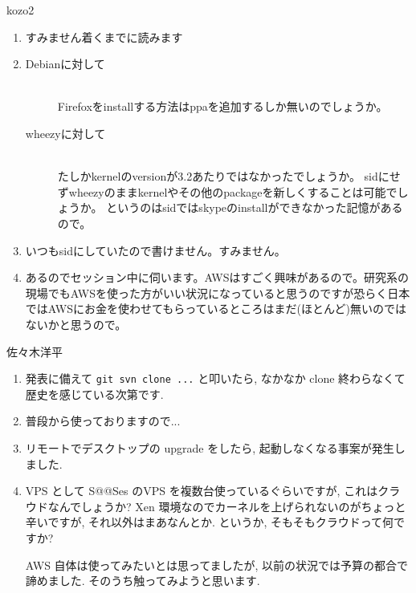 \documentclass[mingoth,a4paper]{jsarticle}
\begin{document}
\begin{prework}{ kozo2 }
  \begin{enumerate}
  \item %
    すみません着くまでに読みます
  \item %
    \begin{description}
    \item[Debianに対して]　\\
      Firefoxをinstallする方法はppaを追加するしか無いのでしょうか。
    \item[wheezyに対して]　\\
      たしかkernelのversionが3.2あたりではなかったでしょうか。
      sidにせずwheezyのままkernelやその他のpackageを新しくすることは可能でしょうか。
      というのはsidではskypeのinstallができなかった記憶があるので。
    \end{description}
  \item %
    いつもsidにしていたので書けません。すみません。
  \item %
    あるのでセッション中に伺います。AWSはすごく興味があるので。研究系の現場でもAWSを使った方がいい状況になっていると思うのですが恐らく日本ではAWSにお金を使わせてもらっているところはまだ(ほとんど)無いのではないかと思うので。
  \end{enumerate}
\end{prework}

\clearpage

\begin{prework}{ 佐々木洋平 }

  \begin{enumerate}
  \item %
    発表に備えて \texttt{git svn clone ...} と叩いたら, なかなか clone 終わらなくて歴史を感じている次第です.
  \item %
    普段から使っておりますので...
  \item %
    リモートでデスクトップの upgrade をしたら, 起動しなくなる事案が発生しました.
  \item %
    VPS として S@@Ses のVPS を複数台使っているぐらいですが, これはクラウドなんでしょうか?
    Xen 環境なのでカーネルを上げられないのがちょっと辛いですが, それ以外はまあなんとか.
    というか,
    そもそもクラウドって何ですか?

    AWS 自体は使ってみたいとは思ってましたが, 以前の状況では予算の都合で諦めました.
    そのうち触ってみようと思います.
  \end{enumerate}
\end{prework}
\end{document}
